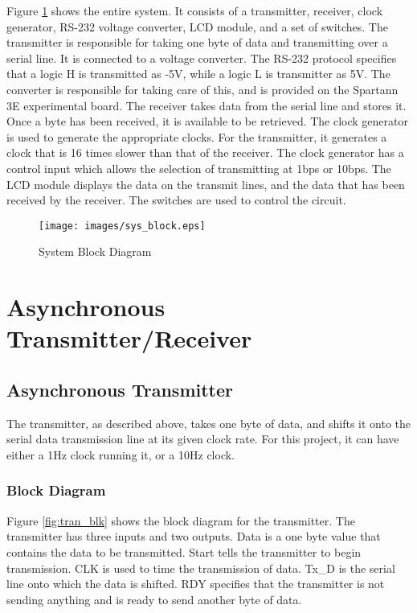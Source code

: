 \documentclass[12pt, a4paper]{article}
\begin{document}
Figure \ref{fig:sys_blk} shows the entire system. It consists of a transmitter, receiver, clock generator,
RS-232 voltage converter, LCD module, and a set of switches. The transmitter is responsible for
taking one byte of data and transmitting over a serial line. It is connected to a voltage converter.
The RS-232 protocol specifies that a logic H is transmitted as -5V, while a logic L is transmitter as
5V. The converter is responsible for taking care of this, and is provided on the Spartann 3E experimental
board.\cite{xilinxug} The receiver takes data from the serial line and stores it. Once a byte has been received, it
is available to be retrieved. The clock generator is used to generate the appropriate clocks. For
the transmitter, it generates a clock that is 16 times slower than that of the receiver. The clock
generator has a control input which allows the selection of transmitting at 1bps or 10bps. The LCD
module displays the data on the transmit lines, and the data that has been received by the receiver.
The switches are used to control the circuit.

\begin{figure}
  \caption{System Block Diagram}
  \centering
  \texttt{[image: images/sys\_block.eps]}
  \label{fig:sys_blk}
\end{figure}


\section{Asynchronous Transmitter/Receiver}
\subsection{Asynchronous Transmitter}
The transmitter, as described above, takes one byte of data, and shifts it onto the serial data
transmission line at its given clock rate. For this project, it can have either a 1Hz clock running
it, or a 10Hz clock.
\subsubsection{Block Diagram}
Figure \ref{fig:tran_blk} shows the block diagram for the transmitter. The transmitter has three inputs
and two outputs. Data is a one byte value that contains the data to be transmitted. Start tells the
transmitter to begin transmission. CLK is used to time the transmission of data. Tx\_D is the serial line
onto which the data is shifted. RDY specifies that the transmitter is not sending anything and
is ready to send another byte of data.
\end{document}
